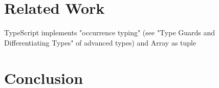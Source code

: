 \renewcommand{\thechapter}{4}
\chapter{Related Work}


TypeScript implements "occurrence typing" (see "Type Guards and Differentiating Types" of advanced types) and Array as tuple 


\renewcommand{\thechapter}{5}
\chapter{Conclusion}